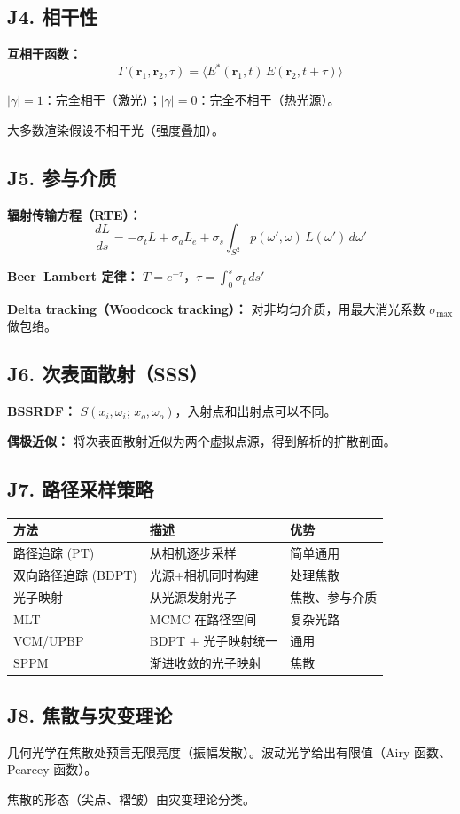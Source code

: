 \subsection{J4. 相干性}

\textbf{互相干函数：}
\[
\Gamma(\mathbf{r}_1, \mathbf{r}_2, \tau) = \langle E^*(\mathbf{r}_1, t)\, E(\mathbf{r}_2, t+\tau) \rangle
\]

$|\gamma| = 1$：完全相干（激光）；$|\gamma| = 0$：完全不相干（热光源）。

大多数渲染假设不相干光（强度叠加）。

\subsection{J5. 参与介质}

\textbf{辐射传输方程（RTE）：}
\[
\frac{dL}{ds} = -\sigma_t L + \sigma_a L_e + \sigma_s \int_{S^2} p(\omega', \omega)\, L(\omega')\, d\omega'
\]

\textbf{Beer--Lambert 定律：} $T = e^{-\tau}$，$\tau = \displaystyle\int_0^s \sigma_t\, ds'$

\textbf{Delta tracking（Woodcock tracking）：} 对非均匀介质，用最大消光系数 $\sigma_{\max}$ 做包络。

\subsection{J6. 次表面散射（SSS）}

\textbf{BSSRDF：} $S(x_i, \omega_i;\, x_o, \omega_o)$，入射点和出射点可以不同。

\textbf{偶极近似：} 将次表面散射近似为两个虚拟点源，得到解析的扩散剖面。

\subsection{J7. 路径采样策略}

\begin{center}
\begin{tabular}{lll}
\toprule
\textbf{方法} & \textbf{描述} & \textbf{优势} \\
\midrule
路径追踪 (PT) & 从相机逐步采样 & 简单通用 \\
双向路径追踪 (BDPT) & 光源+相机同时构建 & 处理焦散 \\
光子映射 & 从光源发射光子 & 焦散、参与介质 \\
MLT & MCMC 在路径空间 & 复杂光路 \\
VCM/UPBP & BDPT + 光子映射统一 & 通用 \\
SPPM & 渐进收敛的光子映射 & 焦散 \\
\bottomrule
\end{tabular}
\end{center}

\subsection{J8. 焦散与灾变理论}

几何光学在焦散处预言无限亮度（振幅发散）。波动光学给出有限值（Airy 函数、Pearcey 函数）。

焦散的形态（尖点、褶皱）由灾变理论分类。